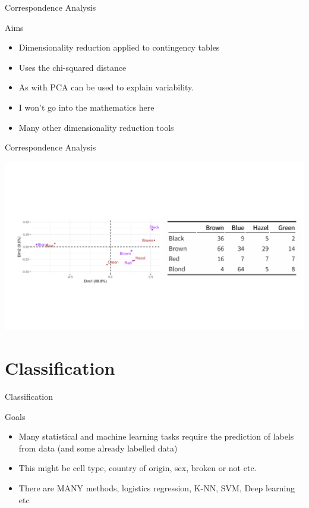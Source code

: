 \documentclass{bredelebeamer}
\begin{document}
\begin{frame}{Correspondence Analysis}

\begin{exampleblock}{Aims}
	
	\begin{itemize}
\item Dimensionality reduction applied to contingency tables
\item Uses the chi-squared distance
\item As with PCA can be used to explain variability.
\item I won't go into the mathematics here
\item Many other dimensionality reduction tools
\end{itemize}
\end{exampleblock}
\end{frame}

\begin{frame}{Correspondence Analysis}

\includegraphics[width = 1\textwidth]{corranalysis}
\end{frame}

\section{Classification}


\begin{frame}{Classification}

\begin{exampleblock}{Goals}
	
\begin{itemize}
	
\item Many statistical and machine learning tasks require the prediction of labels from data (and some already labelled data)
\item This might be cell type, country of origin, sex, broken or not etc.
\item There are MANY methods, logistics regression, K-NN, SVM, Deep learning etc
\end{itemize}

\end{exampleblock}

\end{frame}
\end{document}
